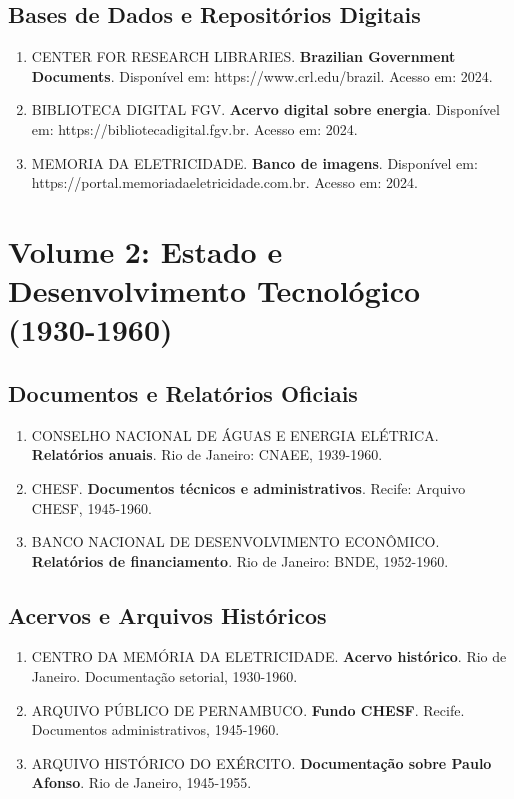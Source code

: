 \documentclass[12pt,a4paper]{report}
\begin{document}
\section*{Bases de Dados e Repositórios Digitais}
\begin{enumerate}[leftmargin=*]
    \item CENTER FOR RESEARCH LIBRARIES. \textbf{Brazilian Government Documents}. Disponível em: https://www.crl.edu/brazil. Acesso em: 2024.
    
    \item BIBLIOTECA DIGITAL FGV. \textbf{Acervo digital sobre energia}. Disponível em: https://bibliotecadigital.fgv.br. Acesso em: 2024.
    
    \item MEMORIA DA ELETRICIDADE. \textbf{Banco de imagens}. Disponível em: https://portal.memoriadaeletricidade.com.br. Acesso em: 2024.
\end{enumerate}

\chapter*{Volume 2: Estado e Desenvolvimento Tecnológico (1930-1960)}

\section*{Documentos e Relatórios Oficiais}
\begin{enumerate}[leftmargin=*]
    \item CONSELHO NACIONAL DE ÁGUAS E ENERGIA ELÉTRICA. \textbf{Relatórios anuais}. Rio de Janeiro: CNAEE, 1939-1960.
    
    \item CHESF. \textbf{Documentos técnicos e administrativos}. Recife: Arquivo CHESF, 1945-1960.
    
    \item BANCO NACIONAL DE DESENVOLVIMENTO ECONÔMICO. \textbf{Relatórios de financiamento}. Rio de Janeiro: BNDE, 1952-1960.
\end{enumerate}

\section*{Acervos e Arquivos Históricos}
\begin{enumerate}[leftmargin=*]
    \item CENTRO DA MEMÓRIA DA ELETRICIDADE. \textbf{Acervo histórico}. Rio de Janeiro. Documentação setorial, 1930-1960.
    
    \item ARQUIVO PÚBLICO DE PERNAMBUCO. \textbf{Fundo CHESF}. Recife. Documentos administrativos, 1945-1960.
    
    \item ARQUIVO HISTÓRICO DO EXÉRCITO. \textbf{Documentação sobre Paulo Afonso}. Rio de Janeiro, 1945-1955.
\end{enumerate}
\end{document}
